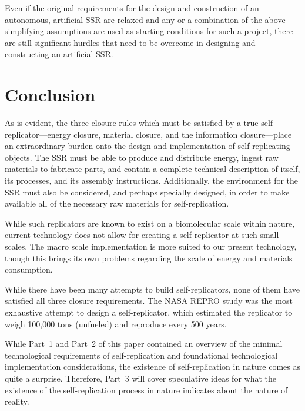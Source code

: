 Even if the original requirements for the design and construction of an
autonomous, artificial SSR are relaxed and any or a combination of the
above simplifying assumptions are used as starting conditions for such
a project, there are still significant hurdles that need to be overcome
in designing and constructing an artificial SSR.

\section{Conclusion}

As is evident, the three closure rules which must be satisfied by a
true self-replicator---energy closure, material closure, 
and the information closure---place an extraordinary burden onto
the design and implementation of self-replicating objects.  The
SSR must be able to produce and distribute energy, ingest raw
materials to fabricate parts, and contain a complete technical
description of itself, its processes, and its assembly instructions.
Additionally, the environment for the SSR must also be considered, 
and perhaps specially designed, in order to make available all
of the necessary raw materials for self-replication.

While such replicators are known to exist on a biomolecular scale within nature,
current technology does not allow for creating a self-replicator 
at such small scales.  The macro scale implementation is more suited
to our present technology, though this brings its own problems regarding 
the scale of energy and materials consumption.  

While there have been many attempts to build self-replicators, none of them have
satisfied all three closure requirements.  The NASA REPRO study was the most
exhaustive attempt to design a self-replicator, which estimated the replicator
to weigh 100,000 tons (unfueled) and reproduce every 500 years.

While Part~1 and Part~2 of this paper contained an overview of the minimal technological
requirements of self-replication and foundational technological implementation considerations,
the existence of self-replication in nature comes as quite a surprise.  Therefore, Part~3
will cover speculative ideas for what the existence of the self-replication process in
nature indicates about the nature of reality.


